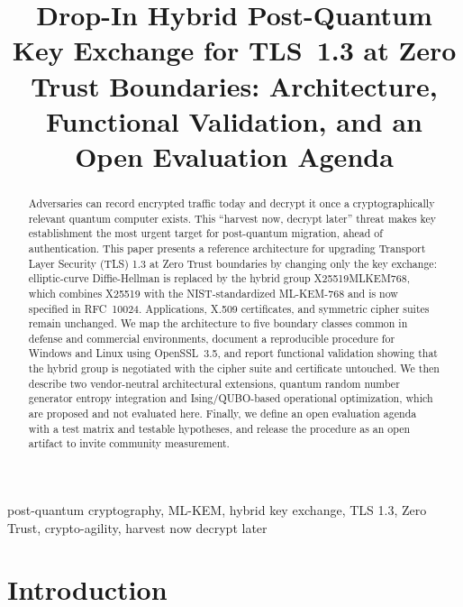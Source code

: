 \documentclass[conference]{IEEEtran}
\begin{document}

\title{Drop-In Hybrid Post-Quantum Key Exchange for TLS~1.3 at Zero Trust Boundaries: Architecture, Functional Validation, and an Open Evaluation Agenda}

\author{
}

\maketitle

\begin{abstract}
Adversaries can record encrypted traffic today and decrypt it once a cryptographically relevant quantum computer exists. This ``harvest now, decrypt later'' threat makes key establishment the most urgent target for post-quantum migration, ahead of authentication. This paper presents a reference architecture for upgrading Transport Layer Security (TLS) 1.3 at Zero Trust boundaries by changing only the key exchange: elliptic-curve Diffie-Hellman is replaced by the hybrid group X25519MLKEM768, which combines X25519 with the NIST-standardized ML-KEM-768 and is now specified in RFC~10024. Applications, X.509 certificates, and symmetric cipher suites remain unchanged. We map the architecture to five boundary classes common in defense and commercial environments, document a reproducible procedure for Windows and Linux using OpenSSL~3.5, and report functional validation showing that the hybrid group is negotiated with the cipher suite and certificate untouched. We then describe two vendor-neutral architectural extensions, quantum random number generator entropy integration and Ising/QUBO-based operational optimization, which are proposed and not evaluated here. Finally, we define an open evaluation agenda with a test matrix and testable hypotheses, and release the procedure as an open artifact to invite community measurement.
\end{abstract}

\begin{IEEEkeywords}
post-quantum cryptography, ML-KEM, hybrid key exchange, TLS 1.3, Zero Trust, crypto-agility, harvest now decrypt later
\end{IEEEkeywords}

\section{Introduction}
\end{document}
